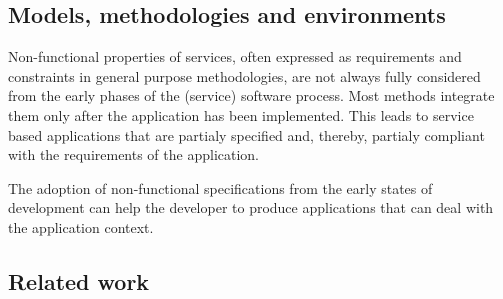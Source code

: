 
\subsection{Models, methodologies and environments}

Non-functional properties of  services, often expressed as requirements and constraints in general purpose methodologies, are not always fully considered from the early phases of the (service) software process. Most methods integrate them only after the application has been implemented. This leads to service based applications that are partialy specified and, thereby, partialy compliant with the requirements of the application.


The adoption of non-functional specifications from the early states of development can help the developer to produce applications that  can deal with the application context.



\subsection{Related work}